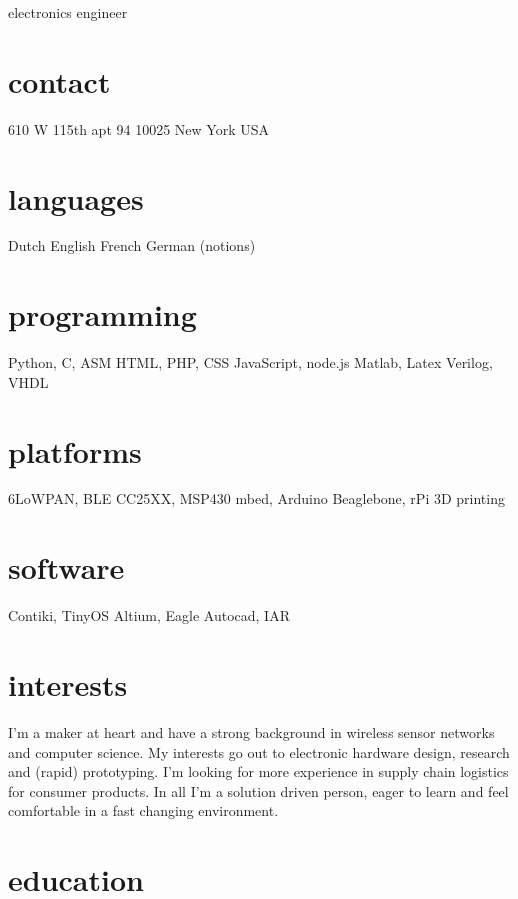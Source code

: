 \documentclass[]{friggeri-cv}
\begin{document}
       {electronics engineer}


\begin{aside}
  \section{contact}
    610 W 115th apt 94
    10025 New York
    USA
    ~
  \section{languages}
    Dutch
    English
    French
    German (notions)
  \section{programming}
    Python, C, ASM
    HTML, PHP, CSS
    JavaScript, node.js
    Matlab, Latex
    Verilog, VHDL
  \section{platforms}
    6LoWPAN, BLE
    CC25XX, MSP430
    mbed, Arduino
    Beaglebone, rPi
    3D printing
  \section{software}
    Contiki, TinyOS
    Altium, Eagle
    Autocad, IAR
\end{aside}

\section{interests}
I'm a maker at heart and have a strong background in wireless sensor networks and computer science. My interests go out to electronic hardware design, research and (rapid) prototyping. I'm looking for more experience in supply chain logistics for consumer products. In all I'm a solution driven person, eager to learn and feel comfortable in a fast changing environment.

\section{education}
\end{document}
